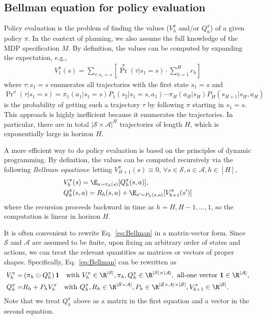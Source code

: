 \subsection{Bellman equation for policy evaluation}
Policy evaluation is the problem of finding the values ($V^\pi_h$ and/or $Q^\pi_h$) of a given policy $\pi$.
In the context of planning, we also assume the full knowledge of the MDP specification $M$.
By definition, the values can be computed by expanding the expectation, e.g., 
\begin{align*}
    V^\pi_1(s) = \sum_{\tau:s_1=s} \left[\textstyle\Pr^\pi(\tau|s_1=s)\cdot\sum_{h=1}^{H}r_h\right]
\end{align*}
where $\tau:s_1=s$ enumerates all trajectories with the first state $s_1=s$ and $\Pr^\pi(\tau|s_1=s)=\pi_1(a_1|s_1=s)P_1(s_2|s_1=s,a_1)\cdots\pi_H(a_H|s_H)P_H(s_{H+1}|s_H,a_H)$ is the probability of getting such a trajectory $\tau$ by following $\pi$ starting in $s_1=s$.
This approach is highly inefficient because it enumerates the trajectories. In particular, there are in total $|\mathcal{S}\times\mathcal{A}|^H$ trajectories of length $H$, which is exponentially large in horizon $H$.

A more efficient way to do policy evaluation is based on the principles of dynamic programming.
By definition, the values can be computed recursively via the following {\em Bellman equations}: letting $V^\pi_{H+1}(s)\equiv0$, $\forall s\in\mathcal{S},a\in\mathcal{A},h\in[H]$,
\begin{align}
\begin{split}\label{eq:Bellman}
& V_h^\pi(s)=\E_{a \sim \pi_h(s)} [Q_h^\pi(s, a)],\\
& Q_h^\pi(s, a)=R_h(s, a)+\E_{s' \sim P_h( s, a)}[V_{h+1}^\pi(s')]
\end{split}
\end{align}
where the recursion proceeds backward in time as $h=H,H-1,\ldots,1$, so the computation is linear in horizon $H$.

It is often convenient to rewrite Eq.~\eqref{eq:Bellman} in a matrix-vector form.
Since $\mathcal{S}$ and $\mathcal{A}$ are assumed to be finite, upon fixing an arbitrary order of states and actions, we can treat the relevant quantities as matrices or vectors of proper shapes.
Specifically, Eq.~\eqref{eq:Bellman} can be rewritten as
\begin{align*}
    V_h^\pi =&\left(\pi_h \odot Q_h^\pi\right)\mathbf{1}
    \quad \text{with }V_h^\pi\in\R^{|\mathcal{S}|}, \pi_h ,Q_h^\pi \in \R^{|\mathcal{S}| \times |\mathcal{A}|}, \text{ all-one vector } \mathbf{1} \in\R^{|\mathcal{A}|}, 
    \\
    Q_h^\pi =& R_h + P_h V^\pi_h \quad \text{with }
    Q_h^\pi, R_h \in \R^{|\mathcal{S} \times \mathcal{A}|},
    P_h\in\R^{|\mathcal{S} \times \mathcal{A}|\times|\mathcal{S}|}, V_{h+1}^\pi\in\R^{|\mathcal{S}|}
    .
\end{align*}
Note that we treat $Q_h^\pi$ above as a matrix in the first equation and a vector in the second equation.


